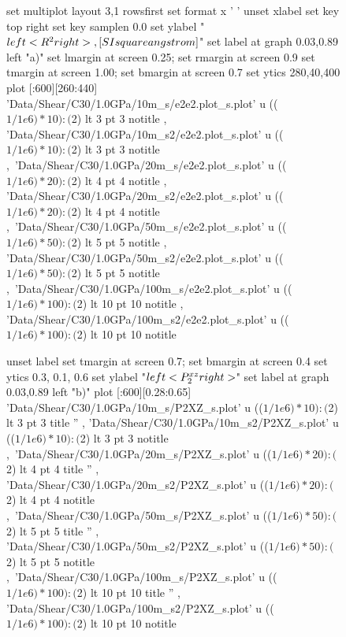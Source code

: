 \documentclass[aps,prb,reprint,superscriptaddress, a4paper]{revtex4-1}
\begin{document}
\begin{figure}
    	\begin{center}
		\begin{gnuplot}[terminal=pdf, terminaloptions={size \SERFigwidth cm, \SERFigheight cm color solid}]
			set multiplot layout 3,1 rowsfirst
			set format x ' '
			unset xlabel
			set key top right
			set key samplen  0.0
			set ylabel "$\\left< R^2\\right>  \\,[\\SI{}{\\square\\angstrom}]$"          
			set label at graph 0.03,0.89 left "a)"
			set lmargin at screen 0.25; set rmargin at screen 0.9
			set tmargin at screen 1.00; set bmargin at screen 0.7
			set ytics 280,40,400 
			plot [:600][260:440] 	'Data/Shear/C30/1.0GPa/10m_s/e2e2.plot_s.plot'  u  (($1/1e6)*10):($2) lt 3 pt 3 notitle  , 'Data/Shear/C30/1.0GPa/10m_s2/e2e2.plot_s.plot'  u (($1/1e6)*10):($2)  lt 3 pt 3 notitle ,\
								'Data/Shear/C30/1.0GPa/20m_s/e2e2.plot_s.plot'  u  (($1/1e6)*20):($2) lt 4 pt 4 notitle  , 'Data/Shear/C30/1.0GPa/20m_s2/e2e2.plot_s.plot'  u (($1/1e6)*20):($2)  lt 4 pt 4 notitle ,\
								'Data/Shear/C30/1.0GPa/50m_s/e2e2.plot_s.plot'   u (($1/1e6)*50):($2) lt 5 pt 5 notitle  , 'Data/Shear/C30/1.0GPa/50m_s2/e2e2.plot_s.plot' u  (($1/1e6)*50):($2)  lt 5 pt 5 notitle ,\
								'Data/Shear/C30/1.0GPa/100m_s/e2e2.plot_s.plot' u  (($1/1e6)*100):($2) lt 10 pt 10 notitle  , 'Data/Shear/C30/1.0GPa/100m_s2/e2e2.plot_s.plot' u (($1/1e6)*100):($2) lt 10 pt 10  notitle 
			
			unset label
			set tmargin at screen 0.7; set bmargin at screen 0.4
			set ytics 0.3, 0.1, 0.6			
			set ylabel "$\\left<P_{2}^{xz}\\right>$"        
			set label at graph 0.03,0.89 left "b)"  
			plot  [:600][0.28:0.65]	'Data/Shear/C30/1.0GPa/10m_s/P2XZ_s.plot' u   (($1/1e6)*10):($2) lt 3 pt 3 title '' , 'Data/Shear/C30/1.0GPa/10m_s2/P2XZ_s.plot' u   (($1/1e6)*10):($2) lt 3 pt 3 notitle  ,\
								'Data/Shear/C30/1.0GPa/20m_s/P2XZ_s.plot' u   (($1/1e6)*20):($2) lt 4 pt 4 title '' , 'Data/Shear/C30/1.0GPa/20m_s2/P2XZ_s.plot' u   (($1/1e6)*20):($2) lt 4 pt 4 notitle  ,\
								'Data/Shear/C30/1.0GPa/50m_s/P2XZ_s.plot' u  (($1/1e6)*50):($2)  lt 5 pt 5 title '' , 'Data/Shear/C30/1.0GPa/50m_s2/P2XZ_s.plot' u  (($1/1e6)*50):($2)  lt 5 pt 5 notitle ,\
								'Data/Shear/C30/1.0GPa/100m_s/P2XZ_s.plot' u  (($1/1e6)*100):($2) lt 10 pt 10 title '' , 'Data/Shear/C30/1.0GPa/100m_s2/P2XZ_s.plot' u (($1/1e6)*100):($2) lt 10 pt 10 notitle 


\end{gnuplot}
\end{center}
\end{figure}
\end{document}
